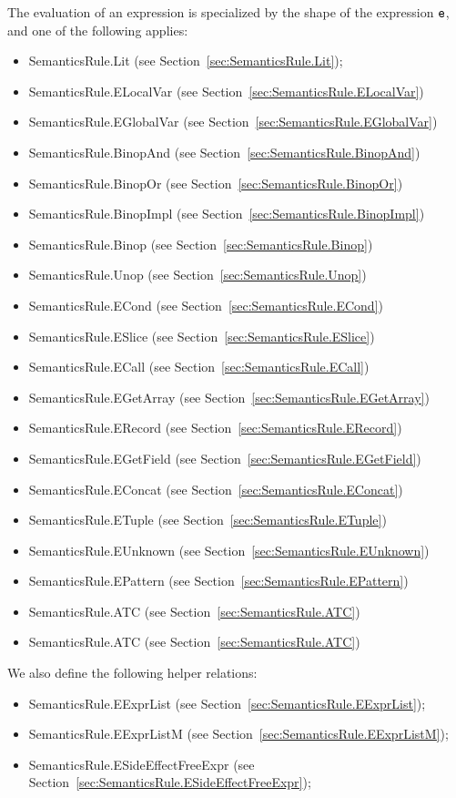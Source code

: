 \documentclass{book}
\begin{document}
The evaluation of an expression is specialized by the shape of the expression $\texttt{e}$,
and one of the following applies:
\begin{itemize}
\item SemanticsRule.Lit (see Section~\ref{sec:SemanticsRule.Lit});
\item SemanticsRule.ELocalVar (see Section~\ref{sec:SemanticsRule.ELocalVar})
\item SemanticsRule.EGlobalVar (see Section~\ref{sec:SemanticsRule.EGlobalVar})
\item SemanticsRule.BinopAnd (see Section~\ref{sec:SemanticsRule.BinopAnd})
\item SemanticsRule.BinopOr (see Section~\ref{sec:SemanticsRule.BinopOr})
\item SemanticsRule.BinopImpl (see Section~\ref{sec:SemanticsRule.BinopImpl})
\item SemanticsRule.Binop (see Section~\ref{sec:SemanticsRule.Binop})
\item SemanticsRule.Unop (see Section~\ref{sec:SemanticsRule.Unop})
\item SemanticsRule.ECond (see Section~\ref{sec:SemanticsRule.ECond})
\item SemanticsRule.ESlice (see Section~\ref{sec:SemanticsRule.ESlice})
\item SemanticsRule.ECall (see Section~\ref{sec:SemanticsRule.ECall})
\item SemanticsRule.EGetArray (see Section~\ref{sec:SemanticsRule.EGetArray})
\item SemanticsRule.ERecord (see Section~\ref{sec:SemanticsRule.ERecord})
\item SemanticsRule.EGetField (see Section~\ref{sec:SemanticsRule.EGetField})
\item SemanticsRule.EConcat (see Section~\ref{sec:SemanticsRule.EConcat})
\item SemanticsRule.ETuple (see Section~\ref{sec:SemanticsRule.ETuple})
\item SemanticsRule.EUnknown (see Section~\ref{sec:SemanticsRule.EUnknown})
\item SemanticsRule.EPattern (see Section~\ref{sec:SemanticsRule.EPattern})
\item SemanticsRule.ATC (see Section~\ref{sec:SemanticsRule.ATC})
\item SemanticsRule.ATC (see Section~\ref{sec:SemanticsRule.ATC})
\end{itemize}

We also define the following helper relations:
\begin{itemize}
  \item SemanticsRule.EExprList (see Section~\ref{sec:SemanticsRule.EExprList});
  \item SemanticsRule.EExprListM (see Section~\ref{sec:SemanticsRule.EExprListM});
  \item SemanticsRule.ESideEffectFreeExpr (see Section~\ref{sec:SemanticsRule.ESideEffectFreeExpr});
\end{itemize}
\end{document}
